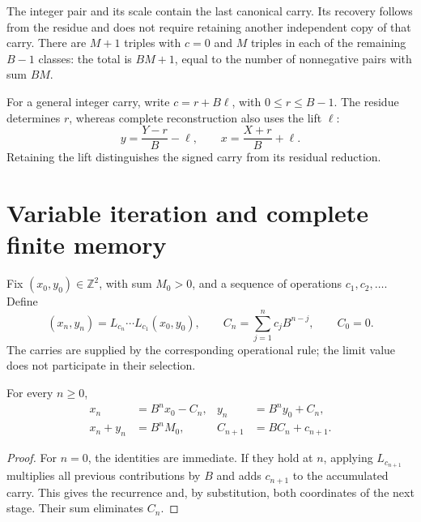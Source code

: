 The integer pair and its scale contain the last canonical carry. Its
recovery follows from the residue and does not require retaining another
independent copy of that carry. There are \(M+1\) triples with \(c=0\) and
\(M\) triples in each of the remaining \(B-1\) classes: the total
is \(BM+1\), equal to the number of nonnegative pairs with sum \(BM\).

For a general integer carry, write
\(c=r+B\ell\), with \(0\leq r\leq B-1\). The residue determines
\(r\), whereas complete reconstruction also uses the
lift \(\ell\):
\begin{equation}
 y=\frac{Y-r}{B}-\ell,\qquad
 x=\frac{X+r}{B}+\ell.
 \label{x_reciprocidad:lib03:elevacion}
\end{equation}
Retaining the lift distinguishes the signed carry from its
residual reduction.

\section{Variable iteration and complete finite memory}
\label{x_reciprocidad:lib03:memoria}

Fix \((x_0,y_0)\in\mathbb Z^2\), with sum \(M_0>0\), and a
sequence of operations \(c_1,c_2,\ldots\). Define
\begin{equation}
 (x_n,y_n)=L_{c_n}\cdots L_{c_1}(x_0,y_0),\qquad
 C_n=\sum_{j=1}^n c_jB^{n-j},\qquad C_0=0.
 \label{x_reciprocidad:lib03:registro-acumulado}
\end{equation}
The carries are supplied by the corresponding operational rule; the
limit value does not participate in their selection.

\begin{theorem}
\label{x_reciprocidad:lib03:teo-acumulacion}
For every \(n\geq0\),
\begin{equation}
 \begin{aligned}
 x_n&=B^nx_0-C_n,& y_n&=B^ny_0+C_n,\\
 x_n+y_n&=B^nM_0,& C_{n+1}&=BC_n+c_{n+1}.
 \end{aligned}
 \label{x_reciprocidad:lib03:iteracion-exacta}
\end{equation}
\end{theorem}

\begin{proof}
For \(n=0\), the identities are immediate. If they hold at
\(n\), applying \(L_{c_{n+1}}\) multiplies all
previous contributions by \(B\) and adds \(c_{n+1}\) to the accumulated carry.
This gives the recurrence and, by substitution, both coordinates of the
next stage. Their sum eliminates \(C_n\).
\end{proof}

